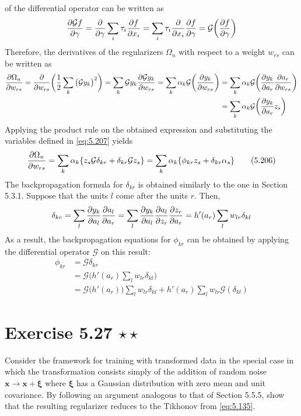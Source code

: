 of the differential operator can be written as
\[
    \pdv{\mathcal{G} f}{\gamma}
    = \pdv{\gamma} \sum_{i}^{} \tau_i \pdv{f}{x_i}
    = \sum_{i}^{} \tau_i \pdv{x_i} \pdv{f}{\gamma}
    = \mathcal{G}\bigg(\pdv{f}{\gamma}\bigg)
\] 
Therefore, the derivatives of the regularizers $\Omega_n$ with respect
to a weight $w_{rs}$ can be written as
\begin{align*}
    \pdv{\Omega_n}{w_{rs}} 
    = \pdv{w_{rs}} \bigg(\frac{1}{2} \sum_{k}^{} \big(\mathcal{G} y_k\big)^2\bigg)
    = \sum_{k}^{} \mathcal{G} y_k \pdv{\mathcal{G}y_k}{w_{rs}}
    = \sum_{k}^{} \alpha_k \mathcal{G}\bigg(\pdv{y_k}{w_{rs}}\bigg)
    &= \sum_{k}^{} \alpha_k \mathcal{G}\bigg(\pdv{y_k}{a_r} \pdv{a_r}{w_{rs}}\bigg) \\
    &= \sum_{k}^{} \alpha_k \mathcal{G}\bigg(\pdv{y_k}{a_r} z_s\bigg)
\end{align*}
Applying the product rule on the obtained expression and substituting the variables
defined in \eqref{eq:5.207} yields
\begin{align*}
    \pdv{\Omega_n}{w_{rs}} 
    = \sum_{k}^{} \alpha_k \{z_s \mathcal{G} \delta_{kr} + \delta_{kr} \mathcal{G} z_s\}
    = \sum_{k}^{} \alpha_k \{\phi_{kr} z_s + \delta_{kr} \alpha_s\} \tag{5.206}
\end{align*}
The backpropagation formula for $\delta_{kr}$ is obtained similarly to the one in Section 5.3.1.
Suppose that the units $l$ come after the units $r$. Then,
\begin{align*}
    \delta_{kr} 
    = \sum_{l}^{} \pdv{y_k}{a_l} \pdv{a_l}{a_r} 
    = \sum_{l}^{} \pdv{y_k}{a_l} \pdv{a_l}{z_r} \pdv{z_r}{a_r} 
    = h'(a_r) \sum_{l}^{} w_{lr} \delta_{kl}
\end{align*}
As a result, the backpropagation equations for $\phi_{kr}$ can be obtained
by applying the differential operator $\mathcal{G}$ on this result:
\begin{align*}
    \phi_{kr} 
    &= \mathcal{G} \delta_{kr} \\
    &= \mathcal{G}\bigg(h'(a_r) \sum_{l}^{} w_{lr} \delta_{kl}\bigg) \\
    &= \mathcal{G} \big(h'(a_r)\big) \sum_{l}^{} w_{lr} \delta_{kl} 
        + h'(a_r) \sum_{l}^{} w_{lr} \mathcal{G}(\delta_{kl})
\end{align*}
\vspace{1em}

\section*{Exercise 5.27 $\star \star$}
Consider the framework for training with transformed data in the special case
in which the transformation consists simply of the addition of random noise 
$\mathbf{x} \to \mathbf{x} + \bm{\xi}$ where $\bm{\xi}$ has a 
Gaussian distribution with zero mean and unit covariance. By following an argument analogous
to that of Section 5.5.5, show that the resulting regularizer reduces to the Tikhonov
from \eqref{eq:5.135}.

